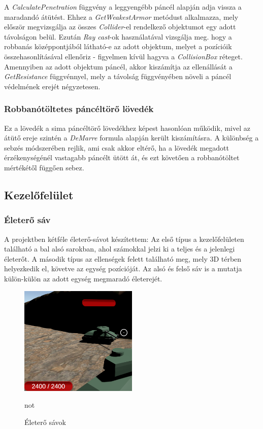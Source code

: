 \documentclass[
]{thesis-ekf}
\theoremstyle{definition}
\theoremstyle{remark}
\begin{document}
A \emph{CalculatePenetration} függvény a leggyengébb páncél alapján adja vissza a maradandó átütést. Ehhez a \emph{GetWeakestArmor} metódust alkalmazza, mely először megvizsgálja az összes \emph{Collider}-el rendelkező objektumot egy adott távolságon belül. Ezután \emph{Ray cast}-ok használatával vizsgálja meg. hogy a robbanás középpontjából látható-e az adott objektum, melyet a pozícióik összehasonlításával ellenőriz - figyelmen kívül hagyva a \emph{CollisionBox} réteget. Amennyiben az adott objektum páncél, akkor kiszámítja az ellenállását a \emph{GetResistance} függvénnyel, mely a távolság függvényében növeli a páncél védelmének erejét négyzetesen.


\subsubsection{Robbanótöltetes páncéltörő lövedék}

Ez a lövedék a sima páncéltörő lövedékhez képest hasonlóan működik, mivel az átütő ereje szintén a \emph{DeMarre} formula alapján került kiszámításra. A különbség a sebzés módszerében rejlik, ami csak akkor eltérő, ha a lövedék megadott érzékenységénél vastagabb páncélt ütött át, és ezt követően a robbanótöltet mértékétől függően sebez.


\subsection{Kezelőfelület}

\subsubsection{Életerő sáv}

A projektben kétféle életerő-sávot készítettem: Az első típus a kezelőfelületen található a bal alsó sarokban, ahol számokkal jelzi ki a teljes és a jelenlegi életerőt. A második típus az ellenségek felett található meg, mely 3D térben helyezkedik el, követve az egység pozícióját. Az alsó és felső sáv is a mutatja külön-külön az adott egység megmaradó életerejét.
\begin{figure}[H]
    \centering
    \includegraphics[width=0.5\textwidth]{screenshots/hpbar.png}
    \caption{Életerő sávok}
    \label{fig:healthbar}not
\end{figure}
\end{document}
